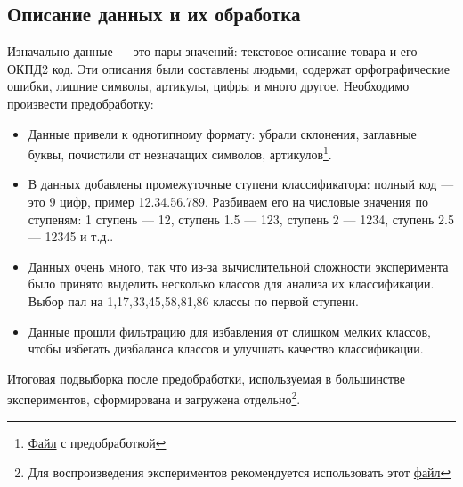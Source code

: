 \documentclass{article}
\begin{document}
\subsection{Описание данных и их обработка}
Изначально данные --- это пары значений: текстовое описание товара и его ОКПД2 код. Эти описания были составлены людьми, содержат орфографические ошибки, лишние символы, артикулы, цифры и много другое. Необходимо произвести предобработку:
\begin{itemize}
\item[\circ] Данные привели к однотипному формату: убрали склонения, заглавные буквы, почистили от незначащих символов, артикулов\footnote{\href{https://github.com/intsystems/2024-Project-142/blob/master/code/preparing_data.ipynb}{Файл} с предобработкой}.
\item[\circ] В данных добавлены промежуточные ступени классификатора: полный код --- это 9 цифр, пример 12.34.56.789. Разбиваем его на числовые значения по ступеням: 1 ступень --- 12, ступень 1.5 --- 123, ступень 2 --- 1234, ступень 2.5 --- 12345 и т.д.. 
\item[\circ] Данных очень много, так что из-за вычислительной сложности эксперимента было принято выделить несколько классов для анализа их классификации. Выбор пал на 1,17,33,45,58,81,86 классы по первой ступени. 
\item[\circ] Данные прошли фильтрацию для избавления от слишком мелких классов, чтобы избегать дизбаланса классов и улучшать качество классификации.
\end{itemize}
Итоговая подвыборка после предобработки, используемая в большинстве экспериментов, сформирована и загружена отдельно\footnote{Для воспроизведения экспериментов рекомендуется использовать этот \href{https://drive.google.com/file/d/12_fNYtyjWvP5SuHyTfmj7NbKX617Lamg/view?usp=sharing}{файл}}.
\end{document}
